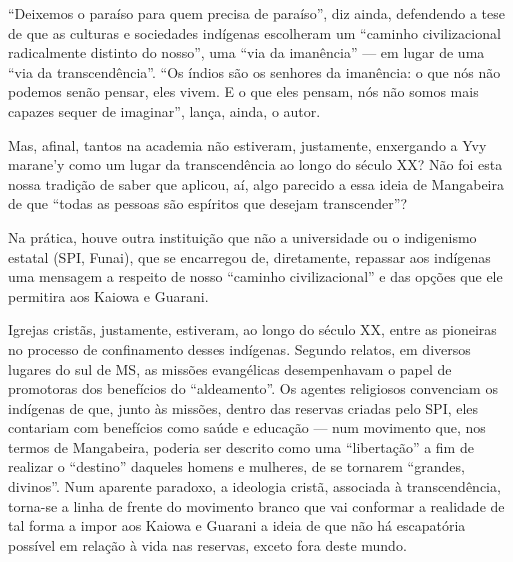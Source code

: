 \documentclass{article}
\begin{document}
{\textquotedblleft}Deixemos o para\'iso para quem precisa de
para\'iso{\textquotedblright}, diz ainda, defendendo a tese de que as
culturas e sociedades ind\'igenas escolheram um
{\textquotedblleft}caminho civilizacional radicalmente distinto do
nosso{\textquotedblright}, uma {\textquotedblleft}via da
iman\^encia{\textquotedblright} --- em lugar de uma
{\textquotedblleft}via da transcend\^encia{\textquotedblright}.
{\textquotedblleft}Os \'indios s\~ao os senhores da iman\^encia: o que
n\'os n\~ao podemos sen\~ao pensar, eles vivem. E o que eles pensam,
n\'os n\~ao somos mais capazes sequer de imaginar{\textquotedblright},
lan\c{c}a, ainda, o autor.

Mas, afinal, tantos na academia n\~ao estiveram, justamente, enxergando
a Yvy marane{\textquoteright}y como um lugar da transcend\^encia ao
longo do s\'eculo XX? N\~ao foi esta nossa tradi\c{c}\~ao de saber que
aplicou, a\'i, algo parecido a essa ideia de Mangabeira de que
{\textquotedblleft}todas as pessoas s\~ao esp\'iritos que desejam
transcender{\textquotedblright}?

Na pr\'atica, houve outra institui\c{c}\~ao que n\~ao a universidade ou
o indigenismo estatal (SPI, Funai), que se encarregou de, diretamente,
repassar aos ind\'igenas uma mensagem a respeito de nosso
{\textquotedblleft}caminho civilizacional{\textquotedblright} e das
op\c{c}\~oes que ele permitira aos Kaiowa e Guarani. 

Igrejas crist\~as, justamente, estiveram, ao longo do s\'eculo XX, entre
as pioneiras no processo de confinamento desses ind\'igenas. Segundo
relatos, em diversos lugares do sul de MS, as miss\~oes evang\'elicas
desempenhavam o papel de promotoras dos benef\'icios do
{\textquotedblleft}aldeamento{\textquotedblright}. Os agentes
religiosos convenciam os ind\'igenas de que, junto \`as miss\~oes,
dentro das reservas criadas pelo SPI, eles contariam com benef\'icios
como sa\'ude e educa\c{c}\~ao --- num movimento que, nos termos de
Mangabeira, poderia ser descrito como uma
{\textquotedblleft}liberta\c{c}\~ao{\textquotedblright} a fim de
realizar o {\textquotedblleft}destino{\textquotedblright} daqueles
homens e mulheres, de se tornarem {\textquotedblleft}grandes,
divinos{\textquotedblright}. Num aparente paradoxo, a ideologia
crist\~a, associada \`a transcend\^encia, torna-se a linha de frente do
movimento branco que vai conformar a realidade de tal forma a impor aos
Kaiowa e Guarani a ideia de que n\~ao h\'a escapat\'oria poss\'ivel em
rela\c{c}\~ao \`a vida nas reservas, exceto fora deste mundo. 
\end{document}
